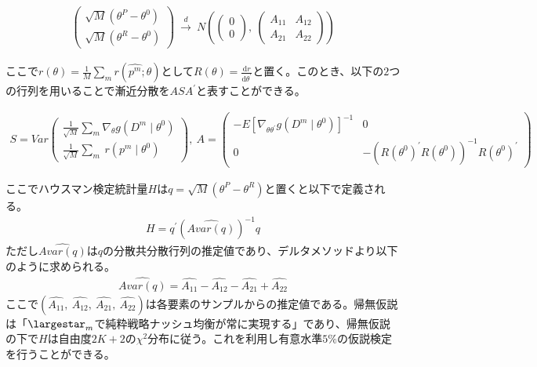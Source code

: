 \begin{align*}
	\begin{pmatrix}
	\sqrt{M}(\theta^P - \theta^0)\\[8pt]
	\sqrt{M}(\theta^R - \theta^0)
	\end{pmatrix}\ \xrightarrow{d}\ 
	N\left( \begin{pmatrix}0\\[8pt]0
	\end{pmatrix},\ 
	\begin{pmatrix}
	A_{11} & A_{12}\\[8pt]
	A_{21} & A_{22}
	\end{pmatrix}
	\right)
\end{align*}

ここで$r(\theta) = \frac{1}{M} \sum_m r(\hat{p^m} ; \theta)$として$R(\theta) = \frac{\mathrm{d}r}{\mathrm{d} \theta^{'}}$と置く。このとき、以下の$2$つの行列を用いることで漸近分散を$A S A^{'}$と表すことができる。

\begin{align*}
	S = Var\begin{pmatrix}
	\frac{1}{\sqrt{M}} \sum_m \nabla_{\theta} g(D^m \mid \theta^0)\\[8pt]
	\frac{1}{\sqrt{M}} \sum_m\ r(p^m \mid \theta^0)
	\end{pmatrix},\ 
	A = \begin{pmatrix}
	-E\left[ \nabla_{\theta \theta^{'}}g(D^m \mid \theta^0) \right]^{-1} & 0\\[8pt]
	0 & -\left( R(\theta^0)^{'} R(\theta^0) \right)^{-1} R(\theta^0)^{'}
	\end{pmatrix}
\end{align*}

ここでハウスマン検定統計量$H$は$q = \sqrt{M} (\theta^P - \theta^R)$と置くと以下で定義される。
\begin{align*}
H = q^{'} \left( \hat{Avar\left( q \right)} \right)^{-1} q
\end{align*}
ただし$\hat{Avar\left( q \right)}$は$q$の分散共分散行列の推定値であり、デルタメソッドより以下のように求められる。
\begin{align*}
	\hat{Avar\left( q \right)} = \hat{A_{11}} - \hat{A_{12}} - \hat{A_{21}} + \hat{A_{22}} 
\end{align*}
ここで$\left(\hat{A_{11}},\ \hat{A_{12}},\ \hat{A_{21}},\ \hat{A_{22}} \right)$は各要素のサンプルからの推定値である。帰無仮説は「$\largestar_m$で純粋戦略ナッシュ均衡が常に実現する」であり、帰無仮説の下で$H$は自由度$2K + 2$の$\chi^2$分布に従う。これを利用し有意水準$5\%$の仮説検定を行うことができる。

